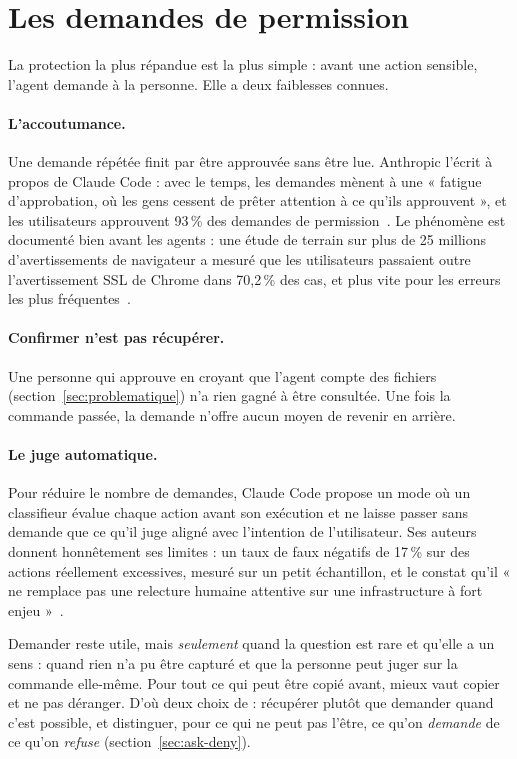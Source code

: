 \section{Les demandes de permission}
\label{sec:permissions}

La protection la plus répandue est la plus simple : avant une action sensible, l'agent
demande à la personne. Elle a deux faiblesses connues.

\paragraph{L'accoutumance.} Une demande répétée finit par être approuvée sans être lue.
Anthropic l'écrit à propos de Claude Code : avec le temps, les demandes mènent à une
« fatigue d'approbation, où les gens cessent de prêter attention à ce qu'ils
approuvent », et les utilisateurs approuvent 93\,\% des demandes de
permission~\cite{anthropic-automode}. Le phénomène est documenté bien avant les agents :
une étude de terrain sur plus de 25 millions d'avertissements de navigateur a mesuré que les
utilisateurs passaient outre l'avertissement SSL de Chrome dans 70,2\,\% des cas, et plus
vite pour les erreurs les plus fréquentes~\cite{akhawe-warningland}.

\paragraph{Confirmer n'est pas récupérer.} Une personne qui approuve  en croyant que l'agent compte des fichiers
(section~\ref{sec:problematique}) n'a rien gagné à être consultée. Une fois la commande
passée, la demande n'offre aucun moyen de revenir en arrière.

\paragraph{Le juge automatique.} Pour réduire le nombre de demandes, Claude Code propose un
mode où un classifieur évalue chaque action avant son exécution et ne laisse passer sans
demande que ce qu'il juge aligné avec l'intention de l'utilisateur. Ses auteurs donnent
honnêtement ses limites : un taux de faux négatifs de 17\,\% sur des actions réellement
excessives, mesuré sur un petit échantillon, et le constat qu'il « ne remplace pas une
relecture humaine attentive sur une infrastructure à fort enjeu »~\cite{anthropic-automode}.

\begin{pourquoi}
Demander reste utile, mais \emph{seulement} quand la question est rare et qu'elle a un
sens : quand rien n'a pu être capturé et que la personne peut juger sur la commande
elle-même. Pour tout ce qui peut être copié avant, mieux vaut copier et ne pas déranger.
D'où deux choix de \demo{} : récupérer plutôt que demander quand c'est possible, et
distinguer, pour ce qui ne peut pas l'être, ce qu'on \emph{demande} de ce qu'on
\emph{refuse} (section~\ref{sec:ask-deny}).
\end{pourquoi}
